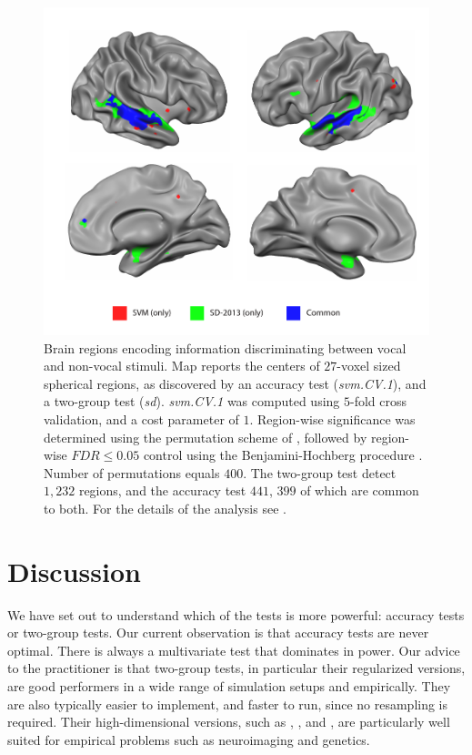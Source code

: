 \documentclass[journal]{IEEEtran}
\begin{document}
\begin{figure}[th]
	\centering
	\includegraphics[width=1\columnwidth]{"art/svm_vs_SD"}
	\caption{\footnotesize
		Brain regions encoding information discriminating between vocal and non-vocal stimuli.
		Map reports the centers of $27$-voxel sized spherical regions, as discovered by an accuracy test (\emph{svm.CV.1}), and a two-group test (\emph{sd}). 
		\emph{svm.CV.1} was computed using $5$-fold cross validation, and a cost parameter of $1$. 
		Region-wise significance was determined using the permutation scheme of \cite{stelzer_statistical_2013}, followed by region-wise $FDR \leq 0.05$ control using the Benjamini-Hochberg procedure \cite{benjamini_controlling_1995}.
		Number of permutations equals $400$.
		The two-group test detect $1,232$ regions, and the accuracy test $441$, $399$ of which are common to both.
		For the details of the analysis see \cite{gilron_quantifying_2016}.  
	}
	\label{fig:read_data}
\end{figure}








\section{Discussion}
\label{sec:discussion}

We have set out to understand which of the tests is more powerful: accuracy tests or two-group tests. 
Our current observation is that accuracy tests are never optimal.
There is always a multivariate test that dominates in power. 
Our advice to the practitioner is that two-group tests, in particular their regularized versions, are good performers in a wide range of simulation setups and empirically. 
They are also typically easier to implement, and faster to run, since no resampling is required. 
Their high-dimensional versions, such as \cite{schafer_shrinkage_2005}, \cite{goeman2006testing}, and \cite{srivastava_multivariate_2007}, are particularly well suited for empirical problems such as neuroimaging and genetics.
\end{document}
